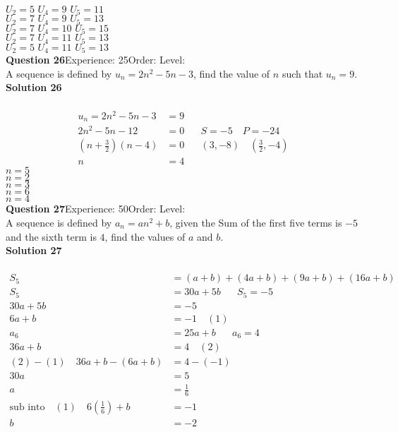 \documentclass{article}
\begin{document}
$U_2=5 \,\, U_4=9 \,\, U_5=11$\\
$U_2=7 \,\, U_4=9 \,\, U_5=13$\\
$U_2=7 \,\, U_4=10 \,\, U_5=15$\\
$U_2=7 \,\, U_4=11 \,\, U_5=13$\\
$U_2=5 \,\, U_4=11 \,\, U_5=13$\\
\noindent\textbf{Question 26}\hspace{20pt}Experience: 25\hspace{20pt}Order: \hspace{20pt}Level: \\[2pt]
A sequence is defined by $u_n=2n^2-5n-3$, find the value of $n$ such that $u_n=9$.\\[4pt]
\noindent\textbf{Solution 26}\\[2pt]
\\[-10pt]\begin{align*}
u_n=2n^2-5n-3&=9\\[2pt]
2n^2-5n-12&=0\hspace{20pt}S=-5 \quad P=-24\\[2pt]
\left(n+\displaystyle\frac{3}{2}\right)(n-4)&=0\hspace{20pt} (3,-8)\quad\left(\displaystyle\frac{3}{2},-4\right)\\[2pt]
n&=4
\end{align*}
$n=5$\\
$n=2$\\
$n=3$\\
$n=6$\\
$n=4$\\
\noindent\textbf{Question 27}\hspace{20pt}Experience: 50\hspace{20pt}Order: \hspace{20pt}Level: \\[2pt]
A sequence is defined by $a_n=an^2+b$, given the Sum of the first five terms is $-5$ and the sixth term is $4$, find the values of $a$ and $b$.\\[4pt]
\noindent\textbf{Solution 27}\\[2pt]
\\[-10pt]\begin{align*}
S_5&=(a+b)+(4a+b)+(9a+b)+(16a+b)\\[2pt]
S_5&=30a+5b\hspace{20pt} S_5=-5\\[2pt]
30a+5b&=-5\\[2pt]
6a+b&=-1\quad (1)\\[12pt]
a_6&=25a+b\hspace{20pt}a_6=4\\[2pt]
36a+b&=4\quad (2)\\[12pt]
(2)-(1)\quad 36a+b-(6a+b)&=4-(-1)\\[2pt]
30a&=5\\[2pt]
a&=\displaystyle\frac{1}{6}\\[12pt]
\text{sub into}\quad (1) \quad 6\left(\displaystyle\frac{1}{6}\right)+b&=-1\\[2pt]
b&=-2\\[2pt]
\end{align*}
\end{document}
